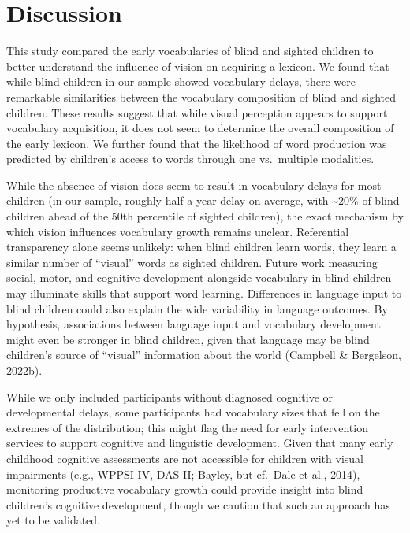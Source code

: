 \documentclass[
  man,floatsintext]{apa6}
\begin{document}
\hypertarget{discussion}{%
\section{Discussion}\label{discussion}}

This study compared the early vocabularies of blind and sighted children to better understand the influence of vision on acquiring a lexicon. We found that while blind children in our sample showed vocabulary delays, there were remarkable similarities between the vocabulary composition of blind and sighted children. These results suggest that while visual perception appears to support vocabulary acquisition, it does not seem to determine the overall composition of the early lexicon. We further found that the likelihood of word production was predicted by children's access to words through one vs.~multiple modalities.

While the absence of vision does seem to result in vocabulary delays for most children (in our sample, roughly half a year delay on average, with \textasciitilde20\% of blind children ahead of the 50th percentile of sighted children), the exact mechanism by which vision influences vocabulary growth remains unclear. Referential transparency alone seems unlikely: when blind children learn words, they learn a similar number of ``visual'' words as sighted children. Future work measuring social, motor, and cognitive development alongside vocabulary in blind children may illuminate skills that support word learning. Differences in language input to blind children could also explain the wide variability in language outcomes. By hypothesis, associations between language input and vocabulary development might even be stronger in blind children, given that language may be blind children's source of ``visual'' information about the world (Campbell \& Bergelson, 2022b).

While we only included participants without diagnosed cognitive or developmental delays, some participants had vocabulary sizes that fell on the extremes of the distribution; this might flag the need for early intervention services to support cognitive and linguistic development. Given that many early childhood cognitive assessments are not accessible for children with visual impairments (e.g., WPPSI-IV, DAS-II; Bayley, but cf.~Dale et al., 2014), monitoring productive vocabulary growth could provide insight into blind children's cognitive development, though we caution that such an approach has yet to be validated.
\end{document}
